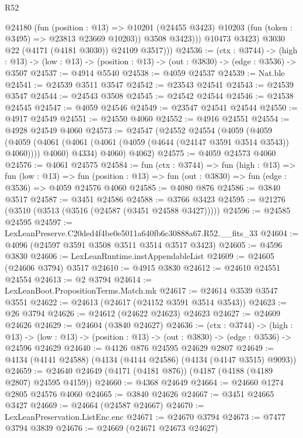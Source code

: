 \begin{lexlean}{R52}
\begin{coremodule}
                @24180
                  (fun (position : @13) =>
                  @10201 (@24455 @3423) @10203 (fun (token : @3495) => @23813 @23669 @10203))
                  @3508
                  @3423)))
            @10473
            @3423)
          @3030
          @22
          (@4171 (@4181 @3030))
          @24109
          @3517)))
@24536 := (ctx : @3744) ->
  (high : @13) -> (low : @13) -> (position : @13) -> (out : @3830) -> (edge : @3536) -> @3507
@24537 := @4914 @5540
@24538 := @4059 @24537
@24539 := Nat.ble
@24541 := @24539 @3511 @3547
@24542 := @23543 @24541
@24543 := @24539 @3547
@24544 := @24543 @3508
@24545 := @24542 @24544
@24546 := @24538 @24545
@24547 := @4059 @24546
@24549 := @23547 @24541 @24544
@24550 := @4917 @24549
@24551 := @24550 @4060
@24552 := @4916 @24551
@24554 := @4928 @24549 @4060
@24573 := @24547
    (@24552
      @24554
      (@4059
        (@4059
          (@4059 (@4061 (@4061 (@4061 (@4059 (@4644 (@24147 @3591 @3514 @3543)) @4060)))) @4060)
          @4334)
        @4060)
      @4062)
@24575 := @4059 @24573 @4060
@24576 := @4061 @24575
@24584 := fun (ctx : @3744) =>
  fun (high : @13) =>
  fun (low : @13) =>
  fun (position : @13) => fun (out : @3830) => fun (edge : @3536) => @4059 @24576 @4060
@24585 := @4080 @876
@24586 := @3840 @3517
@24587 := @3451 @24586
@24588 := @3766 @3423
@24595 := @21276 (@3510 (@3513 (@3516 (@24587 (@3451 @24588 @3427)))))
@24596 := @24585 @24595
@24597 := LexLeanPreserve.C20ded4f4be0e5011a640fb6c30888a67.R52.__fits_33
@24604 := @4096 (@24597 @3591 @3508 @3511 @3514 @3517 @3423)
@24605 := @4596 @3830
@24606 := LexLeanRuntime.instAppendableList
@24609 := @24605 (@24606 @3794) @3517
@24610 := @4915 @3830
@24612 := @24610 @24551 @24554
@24613 := @2 @3794
@24614 := LexLeanBoot.PropositionTerms.Match.mk
@24617 := @24614 @3539 @3547 @3551
@24622 := @24613 (@24617 (@24152 @3591 @3514 @3543))
@24623 := @26 @3794
@24626 := @24612 (@24622 @24623) @24623
@24627 := @24609 @24626
@24629 := @24604 (@3840 @24627)
@24636 := (ctx : @3744) ->
  (high : @13) ->
  (low : @13) -> (position : @13) -> (out : @3830) -> (edge : @3536) -> @24596 @24629
@24640 := @4126 @876 @24595 @24629 @2807
@24649 := @4134 (@4141 @24588) (@4134 (@4144 @24586) (@4134 (@4147 @3515) @9093))
@24659 := @24640 @24649 (@4171 (@4181 @876)) (@4187 (@4188 (@4189 @2807) @24595 @4159))
@24660 := @4368 @24649
@24664 := @24660 @1274 @2805 @24576 @4060
@24665 := @3840 @24626
@24667 := @3451 @24665 @3427
@24669 := @24664 (@24587 @24667)
@24670 := LexLeanPreservation.ListEnc.enc
@24671 := @24670 @3794
@24673 := @7477 @3794 @3839
@24676 := @24669 (@24671 @24673 @24627)

\end{coremodule}
\end{lexlean}
